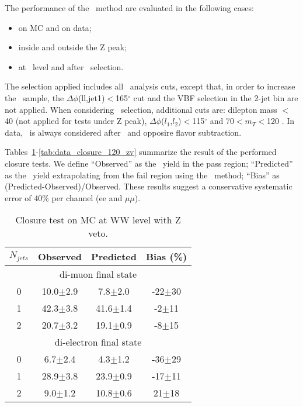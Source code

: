 The performance of the \zm\ method are evaluated in the following cases:
\begin{itemize}
\item on MC and on data;
\item inside and outside the Z peak;
\item at \WW\ level and after  \GeVcc\ selection.
\end{itemize}

The selection applied includes all \hww\ analysis cuts, except that, in order to increase the \dyll\ sample, 
the $\Delta\phi$(ll,jet1)$<$165$^\circ$ cut and the VBF selection in the 2-jet bin are not applied.
When considering   \GeVcc\ selection, additional cuts are: dilepton mass $<$40 \GeVcc (not applied for tests under Z peak), 
$\Delta\phi$($l_1$,$l_2$)$<$115$^\circ$ and 70$<$$m_T$$<$120 \GeVcc.
In data, \dyll\ is always considered after \V\Z\ and opposire flavor subtraction.


Tables~\ref{tab:mc_closure_ww_zv}-\ref{tab:data_closure_120_zv} summarize the result of the performed closure tests.
We define ``Observed'' as the \dyll\ yield in the pass region; ``Predicted'' as the \dyll\ yield extrapolating from the fail region using the \zm\ method;
``Bias'' as (Predicted-Observed)/Observed.
These results suggest a conservative systematic error of 40\% per channel (ee and $\mu\mu$).

\begin{table}[!ht]
\begin{center}
\begin{tabular} {|c|ccc|}
\hline
$N_{jets}$  & Observed & Predicted & Bias (\%) \\
\hline 
\hline
\multicolumn{4}{|c|}{di-muon final state} \\
\hline
0 & 10.0$\pm$2.9 &  7.8$\pm$2.0 & -22$\pm$30 \\
1 & 42.3$\pm$3.8 & 41.6$\pm$1.4 &  -2$\pm$11 \\
2 & 20.7$\pm$3.2 & 19.1$\pm$0.9 &  -8$\pm$15 \\
\hline 
\hline
\multicolumn{4}{|c|}{di-electron final state} \\
\hline
0 &  6.7$\pm$2.4 &  4.3$\pm$1.2 & -36$\pm$29 \\
1 & 28.9$\pm$3.8 & 23.9$\pm$0.9 & -17$\pm$11 \\
2 &  9.0$\pm$1.2 & 10.8$\pm$0.6 &  21$\pm$18 \\
\hline 
\end{tabular}
\caption{Closure test on MC at WW level with Z veto.}
\label{tab:mc_closure_ww_zv}
\end{center}
\end{table}



